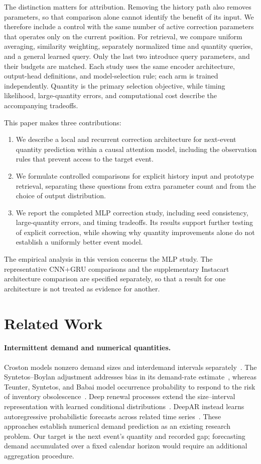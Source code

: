 \documentclass[runningheads]{llncs}
\begin{document}
The distinction matters for attribution. Removing the history path also removes parameters, so that comparison alone cannot identify the benefit of its input. We therefore include a control with the same number of active correction parameters that operates only on the current position. For retrieval, we compare uniform averaging, similarity weighting, separately normalized time and quantity queries, and a general learned query. Only the last two introduce query parameters, and their budgets are matched. Each study uses the same encoder architecture, output-head definitions, and model-selection rule; each arm is trained independently. Quantity is the primary selection objective, while timing likelihood, large-quantity errors, and computational cost describe the accompanying tradeoffs.

This paper makes three contributions:
\begin{enumerate}
\item We describe a local and recurrent correction architecture for next-event quantity prediction within a causal attention model, including the observation rules that prevent access to the target event.
\item We formulate controlled comparisons for explicit history input and prototype retrieval, separating these questions from extra parameter count and from the choice of output distribution.
\item We report the completed MLP correction study, including seed consistency, large-quantity errors, and timing tradeoffs. Its results support further testing of explicit correction, while showing why quantity improvements alone do not establish a uniformly better event model.
\end{enumerate}
The empirical analysis in this version concerns the MLP study. The representative CNN+GRU comparisons and the supplementary Instacart architecture comparison are specified separately, so that a result for one architecture is not treated as evidence for another.

\section{Related Work}
\paragraph{Intermittent demand and numerical quantities.}
Croston models nonzero demand sizes and interdemand intervals separately~\cite{croston1972forecasting}. The Syntetos--Boylan adjustment addresses bias in its demand-rate estimate~\cite{syntetos2005accuracy}, whereas Teunter, Syntetos, and Babai model occurrence probability to respond to the risk of inventory obsolescence~\cite{teunter2011obsolescence}. Deep renewal processes extend the size--interval representation with learned conditional distributions~\cite{turkmen2021renewal}. DeepAR instead learns autoregressive probabilistic forecasts across related time series~\cite{salinas2020deepar}. These approaches establish numerical demand prediction as an existing research problem. Our target is the next event's quantity and recorded gap; forecasting demand accumulated over a fixed calendar horizon would require an additional aggregation procedure.
\end{document}
